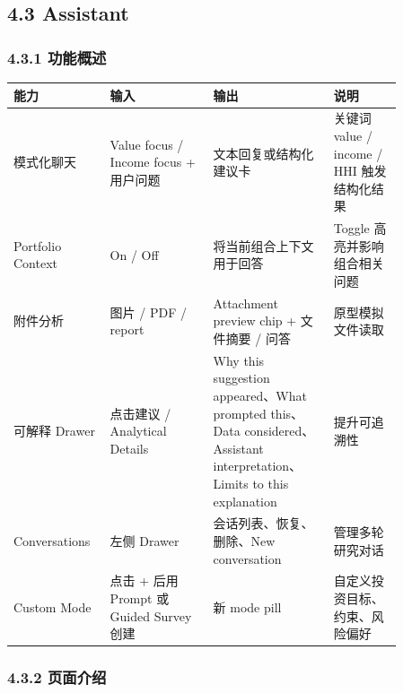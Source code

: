 \subsection{4.3 Assistant}

\subsubsection{4.3.1 功能概述}

\begingroup
\small
\begin{longtable}{L{0.18\linewidth}L{0.24\linewidth}L{0.28\linewidth}L{0.16\linewidth}}
\toprule
\textbf{能力} & \textbf{输入} & \textbf{输出} & \textbf{说明} \\
\midrule
模式化聊天 & Value focus / Income focus + 用户问题 & 文本回复或结构化建议卡 & 关键词 value / income / HHI 触发结构化结果 \\
Portfolio Context & On / Off & 将当前组合上下文用于回答 & Toggle 高亮并影响组合相关问题 \\
附件分析 & 图片 / PDF / report & Attachment preview chip + 文件摘要 / 问答 & 原型模拟文件读取 \\
可解释 Drawer & 点击建议 / Analytical Details & Why this suggestion appeared、What prompted this、Data considered、Assistant interpretation、Limits to this explanation & 提升可追溯性 \\
Conversations & 左侧 Drawer & 会话列表、恢复、删除、New conversation & 管理多轮研究对话 \\
Custom Mode & 点击 + 后用 Prompt 或 Guided Survey 创建 & 新 mode pill & 自定义投资目标、约束、风险偏好 \\
\bottomrule
\end{longtable}
\endgroup

\subsubsection{4.3.2 页面介绍}







